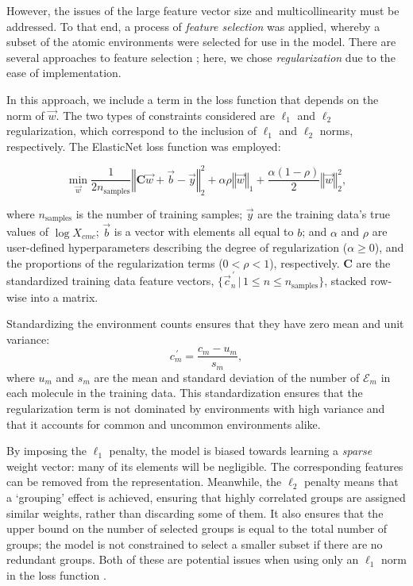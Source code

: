 However, the issues of the large feature vector size and multicollinearity must
be addressed. To that end, a process of \emph{feature selection} was applied,
whereby a subset of the atomic environments were selected for use in the model.
There are several approaches to feature selection
\cite{liFeatureSelectionData2017}; here, we chose \emph{regularization} due to
the ease of implementation.

In this approach, we include a term in the loss function that depends on the
norm of $\vec{w}$. The two types of constraints considered are $\ell_1$ and
$\ell_2$ regularization, which correspond to the inclusion of $\ell_1$ and
$\ell_2$ norms, respectively. The ElasticNet
\cite{zouRegularizationVariableSelection2005} loss function was employed:

\begin{equation}
    \label{eq:elastic}
    \min_{\vec{w}} { \frac{1}{2n_{\text{samples}}} \left \Vert \mathbf{C}\vec{w} + \vec{b}- \vec{y} \right \Vert_2 ^ 2 + \alpha\rho \left \Vert \vec{w} \right \Vert_1} + \frac{\alpha(1 - \rho)}{2} \left \Vert \vec{w} \right \Vert_2^2,
\end{equation}

where $n_{\text{samples}}$ is the number of training samples; $\vec{y}$ are the
training data's true values of $\log X_{cmc}$; $\vec{b}$ is a vector with
elements all equal to $b$; and $\alpha$ and $\rho$ are user-defined
hyperparameters describing the degree of regularization ($\alpha \geq 0$), and
the proportions of the regularization terms ($0 < \rho < 1$), respectively.
$\mathbf{C}$ are the standardized training data feature vectors,
$\{\vec{c}^{\,\prime}_n \,|\, 1 \leq n \leq n_\text{samples}\}$, stacked
row-wise into a matrix.

Standardizing the environment counts ensures that they have zero mean and unit variance:
\begin{equation}
    \label{eq:standard-scaling}
    {c}^{\,\prime}_m = \frac{c_m - u_m}{s_m},
\end{equation}
where $u_m$ and $s_m$ are the mean and standard deviation of the number of
$\mathcal{E}_m$ in each molecule in the training data. This standardization
ensures that the regularization term is not dominated by environments with high
variance and that it accounts for common and uncommon environments alike.

By imposing the $\ell_1$ penalty, the model is biased towards learning a
\emph{sparse} weight vector: many of its elements will be negligible. The
corresponding features can be removed from the representation. Meanwhile, the
$\ell_2$ penalty means that a `grouping' effect is achieved, ensuring that
highly correlated groups are assigned similar weights, rather than discarding
some of them. It also ensures that the upper bound on the number of selected
groups is equal to the total number of groups; the model is not constrained to
select a smaller subset if there are no redundant groups. Both of these are
potential issues when using only an $\ell_1$ norm in the loss function
\cite{efronLeastAngleRegression2004,zouRegularizationVariableSelection2005}.

